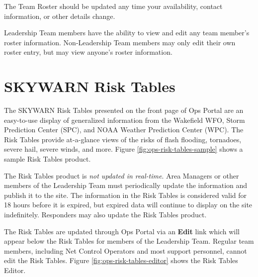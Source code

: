 \documentclass[pdflatex,letterpaper,twoside,12pt]{book}
\begin{document}
The Team Roster should be updated any time your availability, contact information, or other details change.

Leadership Team members have the ability to view and edit any team member's roster information.  Non-Leadership Team members may only edit their own roster entry, but may view anyone's roster information.


\section{SKYWARN Risk Tables}\label{risk-tables-intro}

The SKYWARN Risk Tables presented on the front page of Ops Portal are an easy-to-use display of generalized information from the Wakefield WFO, Storm Prediction Center (SPC), and NOAA Weather Prediction Center (WPC).  The Risk Tables provide at-a-glance views of the risks of flash flooding, tornadoes, severe hail, severe winds, and more.  Figure \ref{fig:ops-risk-tables-sample} shows a sample Risk Tables product.

The Risk Tables product is \emph{not updated in real-time}.  Area Managers or other members of the Leadership Team must periodically update the information and publish it to the site.  The information in the Risk Tables is considered valid for 18 hours before it is expired, but expired data will continue to display on the site indefinitely.  Responders may also update the Risk Tables product.

The Risk Tables are updated through Ops Portal via an \textbf{Edit} link which will appear below the Risk Tables for members of the Leadership Team.  Regular team members, including Net Control Operators and most support personnel, cannot edit the Risk Tables.  Figure \ref{fig:ops-risk-tables-editor} shows the Risk Tables Editor.

\end{document}

